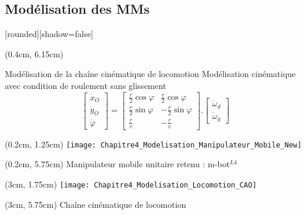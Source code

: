 \documentclass[french]{beamer}
\begin{document}
\subsection{Modélisation des MMs}
\begin{frame} %
[rounded][shadow=false]
{
\scriptsize
\begin{textblock*}{12cm}(0.4cm, 6.15cm)
\begin{block}{Modélisation de la chaîne cinématique de locomotion}
 Modélisation cinématique avec condition de roulement sans glissement
\begin{equation*}
  \left[
  \begin{matrix}
  \dot{x}_O \\
  \dot{y}_O \\
  \dot{\varphi}
  \end{matrix}
  \right]
  =
  \left[
   \begin{matrix}
    \frac{r}{2}\cos\varphi   & \frac{r}{2}\cos\varphi\\
    \frac{r}{2}\sin\varphi  & -\frac{r}{2}\sin\varphi\\
    \frac{r}{v} 			   & -\frac{r}{v}
   \end{matrix}
  \right]
   .
  \left[
   \begin{matrix}
    \dot{\omega}_d \\
    \dot{\omega}_g
   \end{matrix}
  \right]
 \end{equation*}
\end{block}
\end{textblock*}
}


\begin{textblock*}{2.85cm}(0.2cm, 1.25cm)
\flushleft
\texttt{[image: Chapitre4\_Modelisation\_Manipulateur\_Mobile\_New]}
\end{textblock*}
\begin{textblock*}{3cm}(0.2cm, 5.75cm)
\centering
\tiny{Manipulateur mobile unitaire retenu : m-bot$^{L4}$}
\end{textblock*}

\begin{textblock*}{2.75cm}(3cm, 1.75cm)
\centering
\texttt{[image: Chapitre4\_Modelisation\_Locomotion\_CAO]}
\end{textblock*}
\begin{textblock*}{5.25cm}(3cm, 5.75cm)
\centering
\tiny{Chaîne cinématique de locomotion}
\end{textblock*}


\end{frame}
\end{document}
